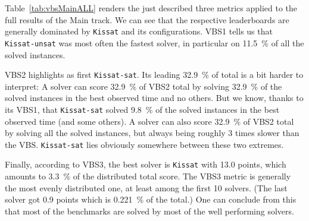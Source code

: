 \documentclass{elsarticle}
\newcommand{\todo}[1]{{\color{purple}Todo: #1}}
\newcommand{\solver}[1]{\texttt{#1}}
\begin{document}

Table~\ref{tab:vbsMainALL} renders the just described three metrics applied 
to the full results of the Main track. We can see that the respective leaderboards 
are generally dominated by \solver{Kissat} and its configurations.
VBS1 tells us that \solver{Kissat-unsat} was most often the fastest solver,
in particular on \SI{11.5}{\percent} of all the solved instances.

VBS2 highlights as first \solver{Kissat-sat}. Its leading \SI{32.9}{\percent} of total is a bit harder to 
interpret: A solver can score \SI{32.9}{\percent} of VBS2 total
by solving \SI{32.9}{\percent} of the solved instances in the best observed time
and no others. But we know, thanks to its VBS1, that \solver{Kissat-sat} solved \SI{9.8}{\percent}
of the solved instances in the best observed time (and some others).
A solver can also score \SI{32.9}{\percent} of VBS2 total by solving all the solved instances,
but always being roughly 3 times slower than the VBS. 
\solver{Kissat-sat} lies obviously somewhere between these two extremes.

Finally, according to VBS3, the best solver is \solver{Kissat} with 13.0 points,
which amounts to \SI{3.3}{\percent} of the distributed total score.
The VBS3 metric is generally the most evenly distributed one,
at least among the first 10 solvers. 
(The last solver got 0.9 points which is \SI{0.221}{\percent} of the total.)
One can conclude from this that most of the benchmarks are solved
by most of the well performing solvers. 
\end{document}
